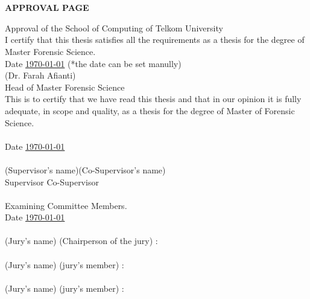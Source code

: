 \chapter*{}
\vspace*{-0.5cm}
\begin{center}
	\normalfont\LARGE\textbf{APPROVAL PAGE}
\end{center}
\onehalfspacing
Approval of the School of Computing of Telkom University \\
I certify that this thesis satisfies all the requirements as a thesis for the degree of Master Forensic Science.\\ 
Date \underline{\mydate \today} (*the date can be set manully)
\vfill
\underline{\hspace*{6cm}}\\
(Dr. Farah Afianti) \\
Head of Master Forensic Science\\ 
This is to certify that we have read this thesis and that in our opinion it is fully adequate, in scope and quality, as a thesis for the degree of Master of Forensic Science.\\\\
Date \underline{\mydate \today}\\
\vfill
\underline{\hspace*{6cm}} \hfill \underline{\hspace*{6cm}}\\
(Supervisor's name)\hfill                                            (Co-Supervisor's name)\\ 
Supervisor   \hfill                                              Co-Supervisor \\\\
Examining Committee Members.\\
Date \underline{\mydate \today}\\
\\
(Jury's name) (Chairperson of the jury) \hfill :\underline{\hspace*{6cm}} \\\\
(Jury's name) (jury’s member)  \hfill :\underline{\hspace*{6cm}} \\\\
(Jury's name) (jury’s member) \hfill :\underline{\hspace*{6cm}} \\\\
